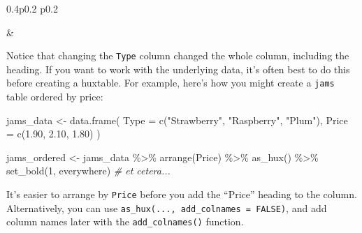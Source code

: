 \documentclass[
]{article}
\newenvironment{Shaded}{\begin{snugshade}}{\end{snugshade}}
\newcommand{\AttributeTok}[1]{\textcolor[rgb]{0.77,0.63,0.00}{#1}}
\newcommand{\CommentTok}[1]{\textcolor[rgb]{0.56,0.35,0.01}{\textit{#1}}}
\newcommand{\DecValTok}[1]{\textcolor[rgb]{0.00,0.00,0.81}{#1}}
\newcommand{\FloatTok}[1]{\textcolor[rgb]{0.00,0.00,0.81}{#1}}
\newcommand{\FunctionTok}[1]{\textcolor[rgb]{0.00,0.00,0.00}{#1}}
\newcommand{\NormalTok}[1]{#1}
\newcommand{\OtherTok}[1]{\textcolor[rgb]{0.56,0.35,0.01}{#1}}
\newcommand{\SpecialCharTok}[1]{\textcolor[rgb]{0.00,0.00,0.00}{#1}}
\newcommand{\StringTok}[1]{\textcolor[rgb]{0.31,0.60,0.02}{#1}}
\begin{document}
\begin{table}[ht]
\begin{centerbox}
\begin{threeparttable}
\begin{tabularx}{0.4\textwidth}{p{} p{}}
\hhline{}

 &
 \tabularnewline[-0.5pt]


\hhline{}
\end{tabularx}
\end{threeparttable}\par\end{centerbox}

\end{table}
 

\FloatBarrier

Notice that changing the \texttt{Type} column changed the whole column,
including the heading. If you want to work with the underlying data,
it's often best to do this before creating a huxtable. For example,
here's how you might create a \texttt{jams} table ordered by price:

\begin{Shaded}
\begin{Highlighting}[]
\NormalTok{jams\_data }\OtherTok{\textless{}{-}} \FunctionTok{data.frame}\NormalTok{(}
        \AttributeTok{Type =} \FunctionTok{c}\NormalTok{(}\StringTok{"Strawberry"}\NormalTok{, }\StringTok{"Raspberry"}\NormalTok{, }\StringTok{"Plum"}\NormalTok{),}
        \AttributeTok{Price =} \FunctionTok{c}\NormalTok{(}\FloatTok{1.90}\NormalTok{, }\FloatTok{2.10}\NormalTok{, }\FloatTok{1.80}\NormalTok{)}
\NormalTok{      )}

\NormalTok{jams\_ordered }\OtherTok{\textless{}{-}}\NormalTok{ jams\_data }\SpecialCharTok{\%\textgreater{}\%} 
      \FunctionTok{arrange}\NormalTok{(Price) }\SpecialCharTok{\%\textgreater{}\%} 
      \FunctionTok{as\_hux}\NormalTok{() }\SpecialCharTok{\%\textgreater{}\%} 
      \FunctionTok{set\_bold}\NormalTok{(}\DecValTok{1}\NormalTok{, everywhere) }\CommentTok{\# et cetera...}
\end{Highlighting}
\end{Shaded}

\FloatBarrier

It's easier to arrange by \texttt{Price} before you add the ``Price''
heading to the column. Alternatively, you can use
\texttt{as\_hux(...,\ add\_colnames\ =\ FALSE)}, and add column names
later with the \texttt{add\_colnames()} function.
\end{document}
